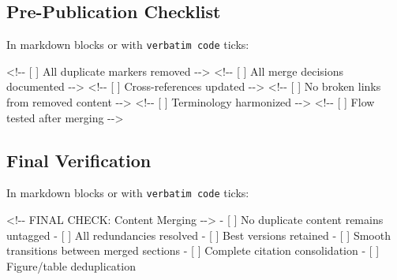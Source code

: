 \documentclass[
  11pt,
  letterpaper,
]{book}
\newenvironment{Shaded}{\begin{snugshade}}{\end{snugshade}}
\newcommand{\CommentTok}[1]{\textcolor[rgb]{0.37,0.37,0.37}{#1}}
\newcommand{\NormalTok}[1]{\textcolor[rgb]{0.00,0.23,0.31}{#1}}
\newcommand{\SpecialStringTok}[1]{\textcolor[rgb]{0.13,0.47,0.30}{#1}}
\newcommand{\VariableTok}[1]{\textcolor[rgb]{0.07,0.07,0.07}{#1}}
\begin{document}

\subsection*{Pre-Publication Checklist}\label{pre-publication-checklist}

In markdown blocks or with \texttt{verbatim\ code} ticks:

\begin{Shaded}
\begin{Highlighting}[]
\CommentTok{\textless{}!{-}{-} [ ] All duplicate markers removed {-}{-}\textgreater{}}
\CommentTok{\textless{}!{-}{-} [ ] All merge decisions documented {-}{-}\textgreater{}}
\CommentTok{\textless{}!{-}{-} [ ] Cross{-}references updated {-}{-}\textgreater{}}
\CommentTok{\textless{}!{-}{-} [ ] No broken links from removed content {-}{-}\textgreater{}}
\CommentTok{\textless{}!{-}{-} [ ] Terminology harmonized {-}{-}\textgreater{}}
\CommentTok{\textless{}!{-}{-} [ ] Flow tested after merging {-}{-}\textgreater{}}
\end{Highlighting}
\end{Shaded}

\subsection*{Final Verification}\label{final-verification}

In markdown blocks or with \texttt{verbatim\ code} ticks:

\begin{Shaded}
\begin{Highlighting}[]
\CommentTok{\textless{}!{-}{-} FINAL CHECK: Content Merging {-}{-}\textgreater{}}
\SpecialStringTok{{-} }\VariableTok{[ ]}\NormalTok{ No duplicate content remains untagged}
\SpecialStringTok{{-} }\VariableTok{[ ]}\NormalTok{ All redundancies resolved}
\SpecialStringTok{{-} }\VariableTok{[ ]}\NormalTok{ Best versions retained}
\SpecialStringTok{{-} }\VariableTok{[ ]}\NormalTok{ Smooth transitions between merged sections}
\SpecialStringTok{{-} }\VariableTok{[ ]}\NormalTok{ Complete citation consolidation}
\SpecialStringTok{{-} }\VariableTok{[ ]}\NormalTok{ Figure/table deduplication}
\end{Highlighting}
\end{Shaded}

\end{document}
